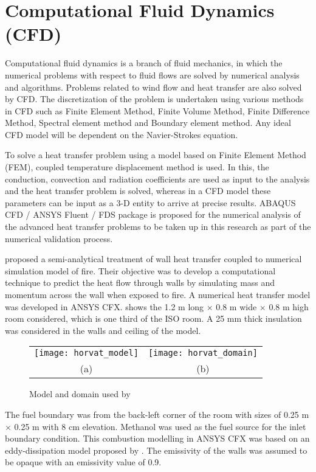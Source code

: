 \section{Computational Fluid Dynamics (CFD)}

Computational fluid dynamics is a branch of fluid mechanics, in which the numerical problems with respect to fluid flows are solved by numerical analysis and algorithms. Problems related to wind flow and heat transfer are also solved by CFD. The discretization of the problem is undertaken using various methods in CFD such as Finite Element Method, Finite Volume Method, Finite Difference Method, Spectral element method and Boundary element method. Any ideal CFD model will be dependent on the Navier-Strokes equation.  

To solve a heat transfer problem using a model based on Finite Element Method (FEM), coupled temperature displacement method is used. In this, the conduction, convection and radiation coefficients are used as input to the analysis and the heat transfer problem is solved, whereas in a CFD model these parameters can be input as a 3-D entity to arrive at precise results. ABAQUS CFD / ANSYS Fluent / FDS package is proposed for the numerical analysis of the advanced heat transfer problems to be taken up in this research as part of the numerical validation process.

\citet{Horvat2009} proposed a semi-analytical treatment of wall heat transfer coupled to numerical simulation model of fire. Their objective was to develop a computational technique to predict the heat flow through walls by simulating mass and momentum across the wall when exposed to fire. A numerical heat transfer model was developed in ANSYS CFX.  shows the 1.2 m long $\times$ 0.8 m wide $\times$ 0.8 m high room considered, which is one third of the ISO room. A 25 mm thick insulation was considered in the walls and ceiling of the model.
\begin{figure}[htbp]
	\centering
		\begin{tabular}{cc}
			\texttt{[image: horvat\_model]} &
			\texttt{[image: horvat\_domain]} \\ 
			(a) & (b) \\ 
		\end{tabular} 
		\caption{Model and domain used by \citet{Horvat2009}}
		\label{fig:horvat_model}
\end{figure}

The fuel boundary was from the back-left corner of the room with sizes of 0.25 m $\times$ 0.25 m with 8 cm elevation. Methanol was used as the fuel source for the inlet boundary condition. This combustion modelling in ANSYS CFX was based on an eddy-dissipation model proposed by \citet{Magnussen1977}. The emissivity of the walls was assumed to be opaque with an emissivity value of 0.9.

